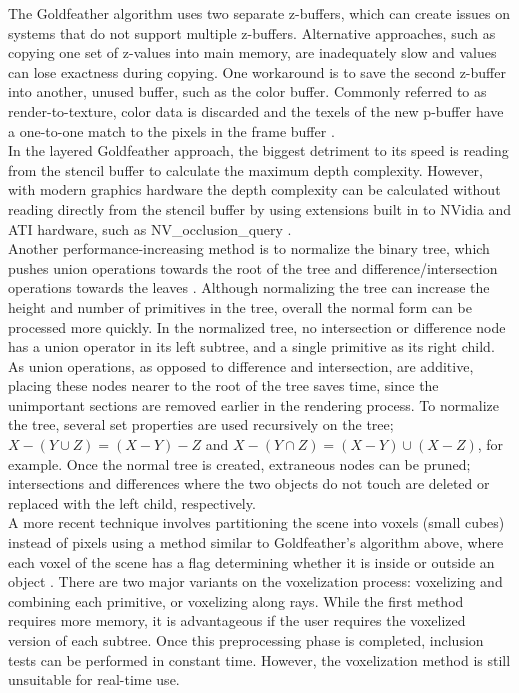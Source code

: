 \documentclass[12pt]{article}
\begin{document}
\begin{doublespace}
The Goldfeather algorithm uses two separate z-buffers, which can create issues on systems that do not support multiple z-buffers. Alternative approaches, such as copying one set of z-values into main memory, are inadequately slow and values can lose exactness during copying. One workaround is to save the second z-buffer into another, unused buffer, such as the color buffer. Commonly referred to as render-to-texture, color data is discarded and the texels of the new p-buffer have a one-to-one match to the pixels in the frame buffer \cite{hardware_csg}.\\

In the layered Goldfeather approach, the biggest detriment to its speed is reading from the stencil buffer to calculate the maximum depth complexity. However, with modern graphics hardware the depth complexity can be calculated without reading directly from the stencil buffer by using extensions built in to NVidia and ATI hardware, such as NV\_occlusion\_query \cite{hardware_csg}.\\

Another performance-increasing method is to normalize the binary tree, which pushes union operations towards the root of the tree and difference/intersection operations towards the leaves \cite{advanced_opengl}. Although normalizing the tree can increase the height and number of primitives in the tree, overall the normal form can be processed more quickly. In the normalized tree, no intersection or difference node has a union operator in its left subtree, and a single primitive as its right child. As union operations, as opposed to difference and intersection, are additive, placing these nodes nearer to the root of the tree saves time, since the unimportant sections are removed earlier in the rendering process. To normalize the tree, several set properties are used recursively on the tree; $X-(Y\cup Z)=(X-Y)-Z$ and $X-(Y\cap Z) = (X-Y)\cup(X-Z)$, for example. Once the normal tree is created, extraneous nodes can be pruned; intersections and differences where the two objects do not touch are deleted or replaced with the left child, respectively.\\

A more recent technique involves partitioning the scene into voxels (small cubes) instead of pixels using a method similar to Goldfeather's algorithm above, where each voxel of the scene has a flag determining whether it is inside or outside an object \cite{geoinformation}. There are two major variants on the voxelization process: voxelizing and combining each primitive, or voxelizing along rays. While the first method requires more memory, it is advantageous if the user requires the voxelized version of each subtree. Once this preprocessing phase is completed, inclusion tests can be performed in constant time. However, the voxelization method is still unsuitable for real-time use.\\


\end{doublespace}
\end{document}

